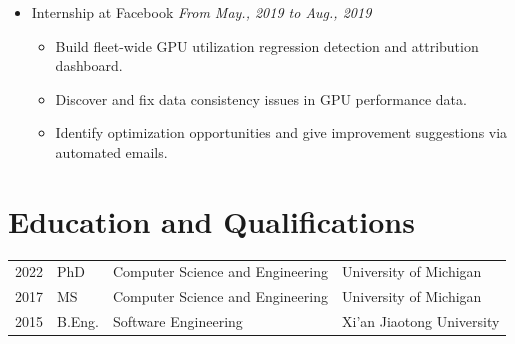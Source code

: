 \documentclass[letterpaper,11pt]{article}
\begin{document}
\begin{itemize}
    \item Internship at Facebook \hfill \textit{From May., 2019 to Aug., 2019}
    \begin{itemize}
        \item Build fleet-wide GPU utilization regression detection and attribution dashboard.
        \item Discover and fix data consistency issues in GPU performance data.
        \item Identify optimization opportunities and give improvement suggestions via automated emails.
    \end{itemize}

\end{itemize}

\section{Education and Qualifications}

\begin{tabular}{llll}
    2022 & PhD  & Computer Science and Engineering & University of Michigan \\
    2017 & MS   & Computer Science and Engineering & University of Michigan \\
    2015 & B.Eng. & Software Engineering & Xi'an Jiaotong University
\end{tabular}

\begin{publications}
\end{publications}
\end{document}
